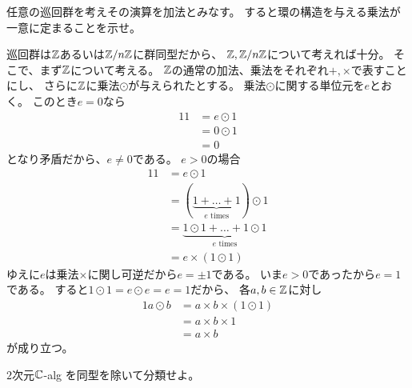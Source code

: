 \documentclass[report]{jlreq}
\begin{document}
\begin{answer}
    \TODO{}
\end{answer}


\begin{problem}[代数学II 1.16]
    任意の巡回群を考えその演算を加法とみなす。
    すると環の構造を与える乗法が一意に定まることを示せ。
\end{problem}

\begin{answer}
    巡回群は$\mathbb{Z}$あるいは$\mathbb{Z}/n\mathbb{Z}$に群同型だから、
    $\mathbb{Z}, \mathbb{Z}/n\mathbb{Z}$について考えれば十分。
    そこで、まず$\mathbb{Z}$について考える。
    $\mathbb{Z}$の通常の加法、乗法をそれぞれ$+, \times$で表すことにし、
    さらに$\mathbb{Z}$に乗法$\odot$が与えられたとする。
    乗法$\odot$に関する単位元を$e$とおく。
    このとき$e = 0$なら
    \begin{alignat}{1}
        1
            &= e \odot 1 \\
            &= 0 \odot 1 \\
            &= 0
    \end{alignat}
    となり矛盾だから、$e \neq 0$である。
    $e > 0$の場合
    \begin{alignat}{1}
        1
            &= e \odot 1 \\
            &= (\underbrace{1 + \dots + 1}_{\text{$e$ times}}) \odot 1 \\
            &= \underbrace{1 \odot 1 + \dots + 1 \odot 1}_{\text{$e$ times}} \\
            &= e \times (1 \odot 1)
    \end{alignat}
    ゆえに$e$は乗法$\times$に関し可逆だから$e = \pm 1$である。
    いま$e > 0$であったから$e = 1$である。
    すると$1 \odot 1 = e \odot e = e = 1$だから、
    各$a, b \in \mathbb{Z}$に対し
    \begin{alignat}{1}
        a \odot b
            &= a \times b \times (1 \odot 1) \\
            &= a \times b \times 1 \\
            &= a \times b
    \end{alignat}
    が成り立つ。
\end{answer}


\begin{problem}[代数学II 1.17]
    $2$次元$\mathbb{C}$-alg を同型を除いて分類せよ。
\end{problem}

\begin{answer}
    \TODO{}
\end{answer}
\end{document}
